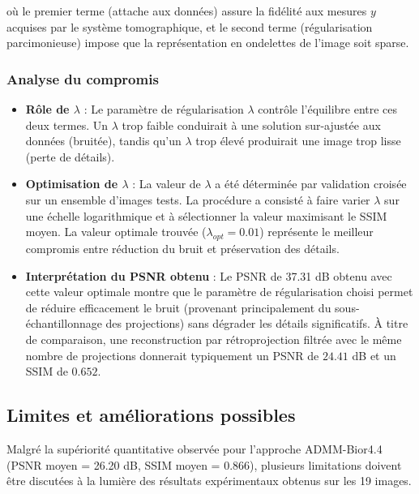 où le premier terme (attache aux données) assure la fidélité aux mesures \(y\) acquises par le système tomographique, et le second terme (régularisation parcimonieuse) impose que la représentation en ondelettes de l'image soit sparse.
\subsubsection*{Analyse du compromis}
\begin{itemize}[label=-]
    \item \textbf{Rôle de \(\lambda\)} : Le paramètre de régularisation \(\lambda\) contrôle l'équilibre entre ces deux termes. Un \(\lambda\) trop faible conduirait à une solution sur-ajustée aux données (bruitée), tandis qu'un \(\lambda\) trop élevé produirait une image trop lisse (perte de détails).
    
    \item \textbf{Optimisation de \(\lambda\)} : La valeur de \(\lambda\) a été déterminée par validation croisée sur un ensemble d'images tests. La procédure a consisté à faire varier \(\lambda\) sur une échelle logarithmique et à sélectionner la valeur maximisant le SSIM moyen. La valeur optimale trouvée (\(\lambda_{opt} = 0.01\)) représente le meilleur compromis entre réduction du bruit et préservation des détails.
    
    \item \textbf{Interprétation du PSNR obtenu} : Le PSNR de 37.31 dB obtenu avec cette valeur optimale montre que le paramètre de régularisation choisi permet de réduire efficacement le bruit (provenant principalement du sous-échantillonnage des projections) sans dégrader les détails significatifs. À titre de comparaison, une reconstruction par rétroprojection filtrée avec le même nombre de projections donnerait typiquement un PSNR de $24.41$ dB et un SSIM de $0.652$.
\end{itemize}

\subsection{Limites et améliorations possibles}
Malgré la supériorité quantitative observée pour l'approche ADMM-Bior4.4 (PSNR moyen = 26.20 dB, SSIM moyen = 0.866), plusieurs limitations doivent être discutées à la lumière des résultats expérimentaux obtenus sur les 19 images.


